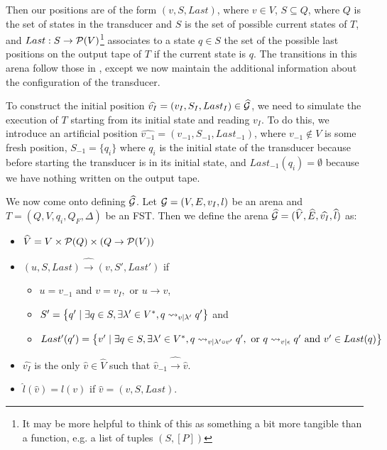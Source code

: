 \documentclass[ %
                    author={Leo Poulson},
                supervisor={Dr. Steven Ramsay},
                    degree={BSc},
                     title={Epistemic Planning for the Dynamic Gossip problem},
                  subtitle={},
                      year={2019} ]{dissertation}
\begin{document}
Then our positions are of the form $(v, S, Last)$, where $v \in V$, $S \subseteq
Q$, where $Q$ is the set of states in the transducer and $S$ is the set of
possible current states of $T$, and $Last : S \rightarrow \mathcal{P}(V)$\footnote{It may be
  more helpful to think of this as something a bit more tangible than a
  function, e.g. a list of tuples $(S, [P])$} associates to a state $q \in S$
the set of the possible last positions on the output tape of $T$ if the current
state is $q$. The transitions in this arena follow those in , except we
now maintain the additional information about the configuration of the
transducer.

To construct the initial position $\widehat{v_I} = (v_I, S_I, Last_I) \in
\widehat{\mathcal{G}}$, we need to simulate the execution of $T$ starting from its
initial state and reading $v_I$. To do this, we introduce an artificial position
$\widehat{v_{-1}} = (v_{-1}, S_{-1}, Last_{-1})$, where $v_{-1} \not \in V$ is
some fresh position, $S_{-1} = \{q_i\}$ where $q_i$ is the initial state of the
transducer because before starting the transducer is in its initial state, and
$Last_{-1} (q_i) = \emptyset$ because we have nothing written on the output
tape.  

We now come onto defining $\widehat{\mathcal{G}}$. Let $\mathcal{G} = (V, E, v_I, l)$ be an arena and
$T = (Q, V, q_i, Q_F, \Delta)$ be an FST. Then we define the arena
$\widehat{\mathcal{G}} = (\widehat{V}, \widehat{E}, \widehat{v_I}, \widehat{l})$ as:

\begin{itemize}
\item $\widehat{V} = V \times \mathcal{P}(Q) \times (Q \rightarrow \mathcal{P}(V))$
\item $(u, S, Last) \widehat{\rightarrow} (v, S', Last')$ if
  \begin{itemize}
  \item $u = v_{-1} \text{ and } v = v_I, \text{ or } u \rightarrow v$,
  \item $S' = \left\{q' \mid \exists q \in S, \exists \lambda' \in V^\ast, q
      \rightsquigarrow_{v \mid \lambda'} q' \right\}$ and
  \item $Last' (q') = \left\{ v' \mid \exists q \in S, \exists \lambda' \in
      V^\ast, q \rightsquigarrow_{v \mid \lambda' \circ v'} q', \text{ or } q \rightsquigarrow_{v \mid
        \epsilon} q' \text{ and } v' \in Last(q) \right\}$
  \end{itemize}
\item $\widehat{v_I}$ is the only $\widehat{v} \in \widehat{V}$ such that
  $\widehat{v}_{-1} \widehat{\rightarrow} \widehat{v}$.
\item $\widehat{l}(\widehat{v}) = l (v)$ if $\widehat{v}= (v, S, Last)$. 
\end{itemize}
\end{document}
